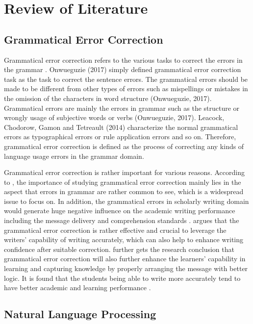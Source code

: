 \chapter{Review of Literature}
\label{chapter2}

\section{Grammatical Error Correction}
Grammatical error correction refers to the various tasks to correct the errors in the grammar \cite{ackah2016review}. 
Onwueguzie (2017) simply defined grammatical error correction task as the task to correct the sentence errors. The grammatical errors should be made to be different from other types of errors such as mispellings or mistakes in the omission of the characters in word structure (Onwueguzie, 2017). Grammatical errors are mainly the errors in grammar such as the structure or wrongly usage of subjective words or verbs (Onwueguzie, 2017). Leacock, Chodorow, Gamon and Tetreault (2014) characterize the normal grammatical errors as typographical errors or rule application errors and so on. Therefore, grammatical error correction is defined as the process of correcting any kinds of language usage errors in the grammar domain. 

Grammatical error correction is rather important for various reasons. According to \cite{nassaji2011correcting}, the importance of studying grammatical error correction mainly lies in the aspect that errors in grammar are rather common to see, which is a widespread issue to focus on. In addition, the grammatical errors in scholarly writing domain would generate huge negative influence on the academic writing performance including the message delivery and comprehension standards \cite{nassaji2011correcting}. 
\cite{truscott2007effect} argues that the grammatical error correction is rather effective and crucial to leverage the writers’ capability of writing accurately, which can also help to enhance writing confidence after suitable correction. 
\cite{truscott2007effect} further gets the research conclusion that grammatical error correction will also further enhance the learners’ capability in learning and capturing knowledge by properly arranging the message with better logic. 
It is found that the students being able to write more accurately tend to have better academic and learning performance \cite{fazio2001effect}.

\section{Natural Language Processing}

